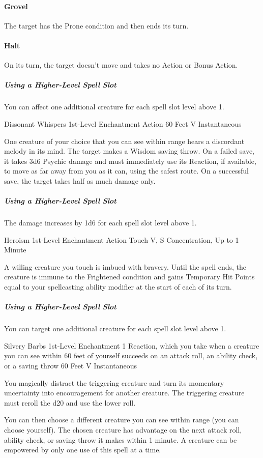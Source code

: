 \documentclass[letterpaper,openany,oneside,twocolumn]{book}
\begin{document}
\paragraph*{Grovel} The target has the Prone condition and then ends its turn.

\paragraph*{Halt} On its turn, the target doesn't move and takes no Action or Bonus Action.

\subparagraph*{Using a Higher-Level Spell Slot} You can affect one additional creature for each spell slot level above 1.

\DndSpellHeader
  {Dissonant Whispers}
  {1st-Level Enchantment}
  {Action}
  {60 Feet}
  {V}
  {Instantaneous}

One creature of your choice that you can see within range hears a discordant melody in its mind. The target makes a Wisdom saving throw. On a failed save, it takes 3d6 Psychic damage and must immediately use its Reaction, if available, to move as far away from you as it can, using the safest route. On a successful save, the target takes half as much damage only.

\subparagraph*{Using a Higher-Level Spell Slot} The damage increases by 1d6 for each spell slot level above 1.

\DndSpellHeader
  {Heroism}
  {1st-Level Enchantment}
  {Action}
  {Touch}
  {V, S}
  {Concentration, Up to 1 Minute}

A willing creature you touch is imbued with bravery. Until the spell ends, the creature is immune to the Frightened condition and gains Temporary Hit Points equal to your spellcasting ability modifier at the start of each of its turn.

\subparagraph*{Using a Higher-Level Spell Slot} You can target one additional creature for each spell slot level above 1.

\DndSpellHeader
  {Silvery Barbs}
  {1st-Level Enchantment}
  {1 Reaction, which you take when a creature you can see within 60 feet of yourself succeeds on an attack roll, an ability check, or a saving throw}
  {60 Feet}
  {V}
  {Instantaneous}

You magically distract the triggering creature and turn its momentary uncertainty into encouragement for another creature. The triggering creature must reroll the d20 and use the lower roll.

You can then choose a different creature you can see within range (you can choose yourself). The chosen creature has advantage on the next attack roll, ability check, or saving throw it makes within 1 minute. A creature can be empowered by only one use of this spell at a time.
\end{document}

